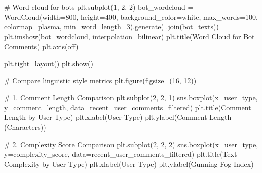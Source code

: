 \documentclass[
  12pt,
  letterpaper,
  DIV=11,
  numbers=noendperiod]{scrartcl}
\newenvironment{Shaded}{\begin{snugshade}}{\end{snugshade}}
\newcommand{\CommentTok}[1]{\textcolor[rgb]{0.37,0.37,0.37}{#1}}
\newcommand{\DecValTok}[1]{\textcolor[rgb]{0.68,0.00,0.00}{#1}}
\newcommand{\NormalTok}[1]{\textcolor[rgb]{0.00,0.23,0.31}{#1}}
\newcommand{\OperatorTok}[1]{\textcolor[rgb]{0.37,0.37,0.37}{#1}}
\newcommand{\StringTok}[1]{\textcolor[rgb]{0.13,0.47,0.30}{#1}}
\begin{document}
\begin{Shaded}
\begin{Highlighting}[]
\CommentTok{\# Word cloud for bots}
\NormalTok{plt.subplot(}\DecValTok{1}\NormalTok{, }\DecValTok{2}\NormalTok{, }\DecValTok{2}\NormalTok{)}
\NormalTok{bot\_wordcloud }\OperatorTok{=}\NormalTok{ WordCloud(width}\OperatorTok{=}\DecValTok{800}\NormalTok{, height}\OperatorTok{=}\DecValTok{400}\NormalTok{, background\_color}\OperatorTok{=}\StringTok{\textquotesingle{}white\textquotesingle{}}\NormalTok{, }
\NormalTok{                         max\_words}\OperatorTok{=}\DecValTok{100}\NormalTok{, colormap}\OperatorTok{=}\StringTok{\textquotesingle{}plasma\textquotesingle{}}\NormalTok{, min\_word\_length}\OperatorTok{=}\DecValTok{3}\NormalTok{).generate(}\StringTok{\textquotesingle{} \textquotesingle{}}\NormalTok{.join(bot\_texts))}
\NormalTok{plt.imshow(bot\_wordcloud, interpolation}\OperatorTok{=}\StringTok{\textquotesingle{}bilinear\textquotesingle{}}\NormalTok{)}
\NormalTok{plt.title(}\StringTok{\textquotesingle{}Word Cloud for Bot Comments\textquotesingle{}}\NormalTok{)}
\NormalTok{plt.axis(}\StringTok{\textquotesingle{}off\textquotesingle{}}\NormalTok{)}

\NormalTok{plt.tight\_layout()}
\NormalTok{plt.show()}

\CommentTok{\# Compare linguistic style metrics}
\NormalTok{plt.figure(figsize}\OperatorTok{=}\NormalTok{(}\DecValTok{16}\NormalTok{, }\DecValTok{12}\NormalTok{))}

\CommentTok{\# 1. Comment Length Comparison}
\NormalTok{plt.subplot(}\DecValTok{2}\NormalTok{, }\DecValTok{2}\NormalTok{, }\DecValTok{1}\NormalTok{)}
\NormalTok{sns.boxplot(x}\OperatorTok{=}\StringTok{\textquotesingle{}user\_type\textquotesingle{}}\NormalTok{, y}\OperatorTok{=}\StringTok{\textquotesingle{}comment\_length\textquotesingle{}}\NormalTok{, data}\OperatorTok{=}\NormalTok{recent\_user\_comments\_filtered)}
\NormalTok{plt.title(}\StringTok{\textquotesingle{}Comment Length by User Type\textquotesingle{}}\NormalTok{)}
\NormalTok{plt.xlabel(}\StringTok{\textquotesingle{}User Type\textquotesingle{}}\NormalTok{)}
\NormalTok{plt.ylabel(}\StringTok{\textquotesingle{}Comment Length (Characters)\textquotesingle{}}\NormalTok{)}

\CommentTok{\# 2. Complexity Score Comparison}
\NormalTok{plt.subplot(}\DecValTok{2}\NormalTok{, }\DecValTok{2}\NormalTok{, }\DecValTok{2}\NormalTok{)}
\NormalTok{sns.boxplot(x}\OperatorTok{=}\StringTok{\textquotesingle{}user\_type\textquotesingle{}}\NormalTok{, y}\OperatorTok{=}\StringTok{\textquotesingle{}complexity\_score\textquotesingle{}}\NormalTok{, data}\OperatorTok{=}\NormalTok{recent\_user\_comments\_filtered)}
\NormalTok{plt.title(}\StringTok{\textquotesingle{}Text Complexity by User Type\textquotesingle{}}\NormalTok{)}
\NormalTok{plt.xlabel(}\StringTok{\textquotesingle{}User Type\textquotesingle{}}\NormalTok{)}
\NormalTok{plt.ylabel(}\StringTok{\textquotesingle{}Gunning Fog Index\textquotesingle{}}\NormalTok{)}


\end{Highlighting}
\end{Shaded}
\end{document}
